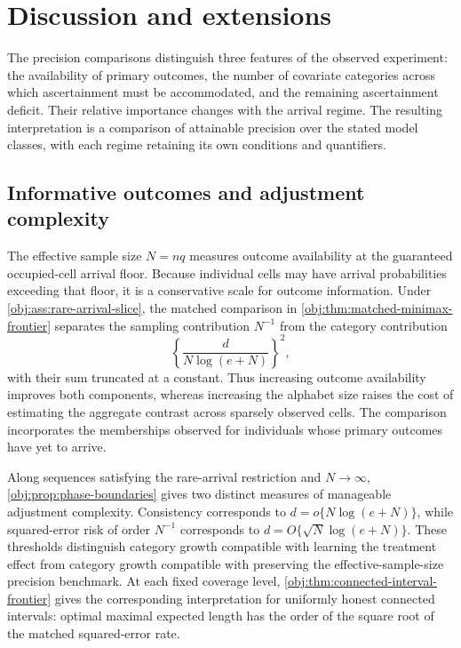 \section{Discussion and extensions}

The precision comparisons distinguish three features of the observed experiment: the availability of primary outcomes, the number of covariate categories across which ascertainment must be accommodated, and the remaining ascertainment deficit. Their relative importance changes with the arrival regime. The resulting interpretation is a comparison of attainable precision over the stated model classes, with each regime retaining its own conditions and quantifiers.

\subsection{Informative outcomes and adjustment complexity}

The effective sample size \(N=nq\) measures outcome availability at the guaranteed occupied-cell arrival floor. Because individual cells may have arrival probabilities exceeding that floor, it is a conservative scale for outcome information. Under \cref{obj:ass:rare-arrival-slice}, the matched comparison in \cref{obj:thm:matched-minimax-frontier} separates the sampling contribution \(N^{-1}\) from the category contribution
\[
\left\{\frac{d}{N\log(e+N)}\right\}^{2},
\]
with their sum truncated at a constant. Thus increasing outcome availability improves both components, whereas increasing the alphabet size raises the cost of estimating the aggregate contrast across sparsely observed cells. The comparison incorporates the memberships observed for individuals whose primary outcomes have yet to arrive.

Along sequences satisfying the rare-arrival restriction and \(N\to\infty\), \cref{obj:prop:phase-boundaries} gives two distinct measures of manageable adjustment complexity. Consistency corresponds to \(d=o\{N\log(e+N)\}\), while squared-error risk of order \(N^{-1}\) corresponds to \(d=O\{\sqrt N\log(e+N)\}\). These thresholds distinguish category growth compatible with learning the treatment effect from category growth compatible with preserving the effective-sample-size precision benchmark. At each fixed coverage level, \cref{obj:thm:connected-interval-frontier} gives the corresponding interpretation for uniformly honest connected intervals: optimal maximal expected length has the order of the square root of the matched squared-error rate.

